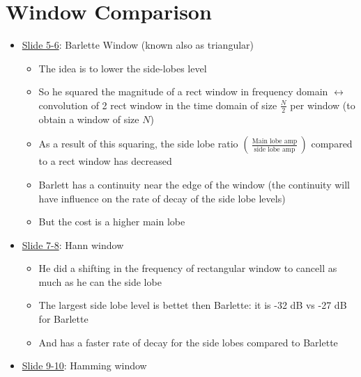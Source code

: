 \documentclass[12pt,a4paper]{book}
\begin{document}
\section{Window Comparison}

\begin{itemize}

\item \underline{Slide 5-6}: Barlette Window (known also as triangular)

\begin{itemize}
    \item The idea is to lower the side-lobes level
    
    
    \item So he squared the magnitude of a rect window in frequency domain $\leftrightarrow$ convolution of 2 rect window in the time domain of size $\displaystyle\frac{N}{2}$ per window (to obtain a window of size $N$)
    
    \item As a result of this squaring, the side lobe ratio $ \left( \, \displaystyle\frac{\text{Main lobe amp}}{\text{side lobe amp}} \, \right)$ compared to a rect window has decreased
    
    
    \item Barlett has a continuity near the edge of the window (the continuity will have influence on the rate of decay of the side lobe levels)
    
    
    \item But the cost is a higher main lobe
    
\end{itemize}

\item \underline{Slide 7-8}: Hann window

\begin{itemize}
    \item He did a shifting in the frequency of rectangular window to cancell as much as he can the side lobe
    
    \item The largest side lobe level is bettet then Barlette: it is -32 dB vs -27 dB for Barlette
    
    \item And has a faster rate of decay for the side lobes compared to Barlette
    
    
\end{itemize}


\item \underline{Slide 9-10}: Hamming window


\end{itemize}
\end{document}
